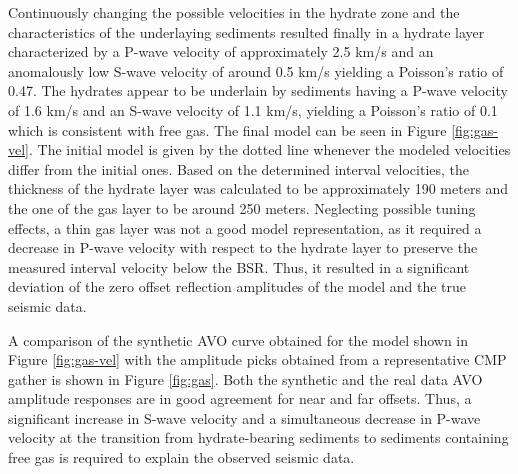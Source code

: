 \par
Continuously changing the possible velocities in the hydrate zone and the 
characteristics of the underlaying sediments resulted finally in a hydrate layer
characterized by a P-wave velocity of approximately 2.5 km/s and an anomalously
low S-wave velocity of around 0.5 km/s yielding a Poisson's ratio of 0.47.
The hydrates appear to be underlain by sediments having a 
P-wave velocity of 1.6 km/s and an S-wave velocity of 1.1 km/s, yielding a
Poisson's ratio of 0.1 which is consistent with free gas. The final model can 
be seen in Figure \ref{fig:gas-vel}. The initial model is given by the dotted line
whenever the modeled velocities differ from the initial ones.
Based on the determined interval velocities,
the thickness of the hydrate layer was calculated to be approximately 190
meters and the one of the gas layer to be around 250 meters. Neglecting possible
tuning effects, a thin gas layer was not a good model representation,
as it required a decrease in P-wave velocity with respect to the hydrate
layer to preserve the measured interval velocity below the BSR. Thus, it
resulted in a significant 
deviation of the zero offset reflection amplitudes of the model
and the true seismic data.
\par
A comparison of the synthetic AVO curve obtained for the model shown in
Figure \ref{fig:gas-vel} with the amplitude picks obtained
from a representative CMP gather is shown in Figure \ref{fig:gas}. Both the
synthetic and the real data AVO amplitude responses are in good agreement
for near and far offsets. Thus, a significant increase in S-wave velocity and
a simultaneous decrease in P-wave velocity at the transition from 
hydrate-bearing sediments to sediments containing free gas is required to
explain the observed seismic data. 





\notinteractive
{}


